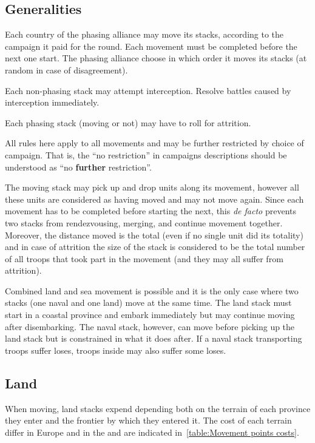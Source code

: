 \subsection{Generalities}
Each country of the phasing alliance may move its stacks, according to the
campaign it paid for the round. Each movement must be completed before the
next one start. The phasing alliance choose in which order it moves its stacks
(at random in case of disagreement).

Each non-phasing stack may attempt interception. Resolve battles caused by
interception immediately.

Each phasing stack (moving or not) may have to roll for attrition.

All rules here apply to all movements and may be further restricted by choice
of campaign. That is, the ``no restriction'' in campaigns descriptions should
be understood as ``no \textbf{further} restriction''.

The moving stack may pick up and drop units along its movement, however all
these units are considered as having moved and may not move again. Since each
movement has to be completed before starting the next, this \emph{de facto}
prevents two stacks from rendezvousing, merging, and continue movement
together. Moreover, the distance moved is the total (even if no single unit
did its totality) and in case of attrition the size of the stack is considered
to be the total number of all troops that took part in the movement (and they
may all suffer from attrition).

Combined land and sea movement is possible and it is the only case where two
stacks (one naval and one land) move at the same time. The land stack must
start in a coastal province and embark immediately but may continue moving
after disembarking. The naval stack, however, can move before picking up the
land stack but is constrained in what it does after. If a naval stack
transporting troops suffer loses, troops inside may also suffer some loses.

\subsection{Land}
When moving, land stacks expend \MP depending both on the terrain of each
province they enter and the frontier by which they entered it. The cost of
each terrain differ in Europe and in the \ROTW and are indicated
in~\ref{table:Movement points costs}.


